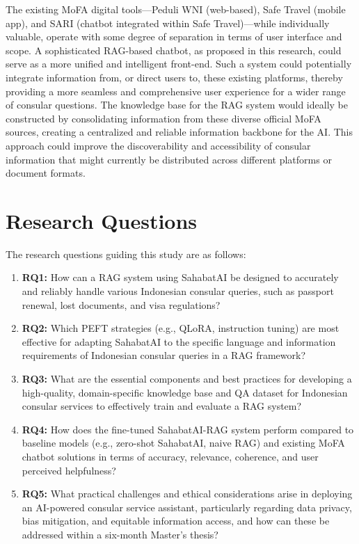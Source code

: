 \documentclass[12pt]{report}
\begin{document}
The existing MoFA digital tools—Peduli WNI (web-based), Safe Travel (mobile app), and SARI (chatbot integrated within Safe Travel)—while individually valuable, operate with some degree of separation in terms of user interface and scope. A sophisticated RAG-based chatbot, as proposed in this research, could serve as a more unified and intelligent front-end. Such a system could potentially integrate information from, or direct users to, these existing platforms, thereby providing a more seamless and comprehensive user experience for a wider range of consular questions. The knowledge base for the RAG system would ideally be constructed by consolidating information from these diverse official MoFA sources, creating a centralized and reliable information backbone for the AI. This approach could improve the discoverability and accessibility of consular information that might currently be distributed across different platforms or document formats.

\section{Research Questions}

The research questions guiding this study are as follows:
\begin{enumerate}
    \item \textbf{RQ1:} How can a RAG system using SahabatAI be designed to accurately and reliably handle various Indonesian consular queries, such as passport renewal, lost documents, and visa regulations?
    \item \textbf{RQ2:} Which PEFT strategies (e.g., QLoRA, instruction tuning) are most effective for adapting SahabatAI to the specific language and information requirements of Indonesian consular queries in a RAG framework?
    \item \textbf{RQ3:} What are the essential components and best practices for developing a high-quality, domain-specific knowledge base and QA dataset for Indonesian consular services to effectively train and evaluate a RAG system?
    \item \textbf{RQ4:} How does the fine-tuned SahabatAI-RAG system perform compared to baseline models (e.g., zero-shot SahabatAI, naive RAG) and existing MoFA chatbot solutions in terms of accuracy, relevance, coherence, and user perceived helpfulness?
    \item \textbf{RQ5:} What practical challenges and ethical considerations arise in deploying an AI-powered consular service assistant, particularly regarding data privacy, bias mitigation, and equitable information access, and how can these be addressed within a six-month Master's thesis?
\end{enumerate}
\end{document}
